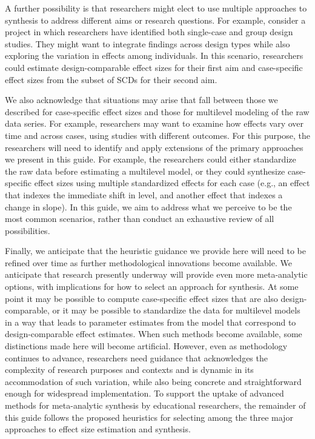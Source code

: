 \documentclass[
]{book}
\begin{document}
A further possibility is that researchers might elect to use multiple approaches to synthesis to address different aims or research questions.
For example, consider a project in which researchers have identified both single-case and group design studies.
They might want to integrate findings across design types while also exploring the variation in effects among individuals.
In this scenario, researchers could estimate design-comparable effect sizes for their first aim and case-specific effect sizes from the subset of SCDs for their second aim.

We also acknowledge that situations may arise that fall between those we described for case-specific effect sizes and those for multilevel modeling of the raw data series.
For example, researchers may want to examine how effects vary over time and across cases, using studies with different outcomes.
For this purpose, the researchers will need to identify and apply extensions of the primary approaches we present in this guide.
For example, the researchers could either standardize the raw data before estimating a multilevel model, or they could synthesize case-specific effect sizes using multiple standardized effects for each case (e.g., an effect that indexes the immediate shift in level, and another effect that indexes a change in slope).
In this guide, we aim to address what we perceive to be the most common scenarios, rather than conduct an exhaustive review of all possibilities.

Finally, we anticipate that the heuristic guidance we provide here will need to be refined over time as further methodological innovations become available.
We anticipate that research presently underway will provide even more meta-analytic options, with implications for how to select an approach for synthesis. At some point it may be possible to compute case-specific effect sizes that are also design-comparable, or it may be possible to standardize the data for multilevel models in a way that leads to parameter estimates from the model that correspond to design-comparable effect estimates.
When such methods become available, some distinctions made here will become artificial.
However, even as methodology continues to advance, researchers need guidance that acknowledges the complexity of research purposes and contexts and is dynamic in its accommodation of such variation, while also being concrete and straightforward enough for widespread implementation.
To support the uptake of advanced methods for meta-analytic synthesis by educational researchers, the remainder of this guide follows the proposed heuristics for selecting among the three major approaches to effect size estimation and synthesis.
\end{document}
